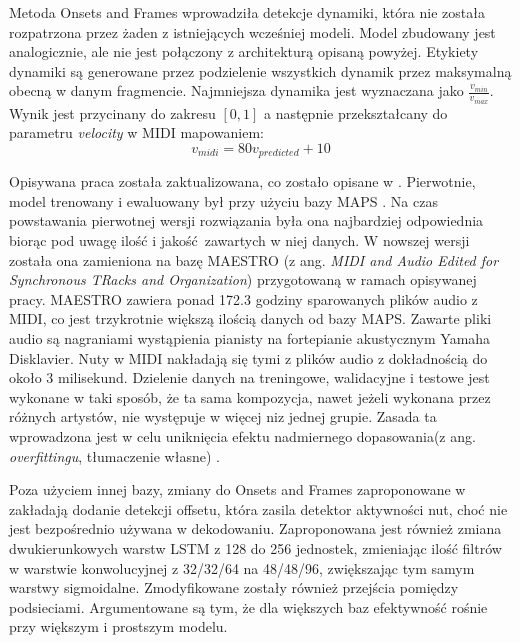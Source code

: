 \documentclass[12pt,a4paper,twoside]{mwart}
\begin{document}
Metoda Onsets and Frames wprowadziła detekcje dynamiki, która nie została rozpatrzona przez żaden z istniejących wcześniej modeli. Model zbudowany jest analogicznie, ale nie jest połączony z architekturą opisaną powyżej. Etykiety dynamiki są generowane przez podzielenie wszystkich dynamik przez maksymalną obecną w danym fragmencie. Najmniejsza dynamika jest wyznaczana jako $\frac{v_{min}}{v_{max}}$. Wynik jest przycinany do zakresu $\left[0,1\right]$ a następnie przekształcany do parametru \textit{velocity} w MIDI mapowaniem:
\begin{equation}
  v_{midi} = 80 v_{predicted} + 10
\end{equation}

Opisywana praca została zaktualizowana, co zostało opisane w 
\cite[3-5]{Transcription:Cheng:OnsetsAndFramesNovelization}
. Pierwotnie, model trenowany i ewaluowany był przy użyciu bazy MAPS \cite{Transcription:OnsetsAndFrames:MAPS}. Na czas powstawania pierwotnej wersji rozwiązania była ona najbardziej odpowiednia biorąc pod uwagę ilość i jakość zawartych w niej danych. W nowszej wersji została ona zamieniona na bazę MAESTRO (z ang. \textit{MIDI and Audio Edited for Synchronous TRacks and Organization}) przygotowaną w ramach opisywanej pracy. MAESTRO zawiera ponad 172.3 godziny sparowanych plików audio z MIDI, co jest trzykrotnie większą ilością danych od bazy MAPS. Zawarte pliki audio są nagraniami wystąpienia pianisty na fortepianie akustycznym Yamaha Disklavier. Nuty w MIDI nakładają się tymi z plików audio z dokładnością do około 3 milisekund. Dzielenie danych na treningowe, walidacyjne i testowe jest wykonane w taki sposób, że ta sama kompozycja, nawet jeżeli wykonana przez różnych artystów, nie występuje w więcej niz jednej grupie. Zasada ta wprowadzona jest w celu uniknięcia efektu nadmiernego dopasowania(z ang. \textit{overfittingu}, tłumaczenie własne) \cite{Transcription:Curtis:MAESTRO}.

Poza użyciem innej bazy, zmiany do Onsets and Frames zaproponowane w 
\cite[3-5]{Transcription:Cheng:OnsetsAndFramesNovelization} 
zakładają dodanie detekcji offsetu, która zasila detektor aktywności nut, choć nie jest bezpośrednio używana w dekodowaniu. Zaproponowana jest również zmiana dwukierunkowych warstw LSTM z 128 do 256 jednostek, zmieniając ilość filtrów w warstwie konwolucyjnej z 32/32/64 na 48/48/96, zwiększając tym samym warstwy sigmoidalne. Zmodyfikowane zostały również przejścia pomiędzy podsieciami. Argumentowane są tym, że dla większych baz efektywność rośnie przy większym i prostszym modelu. 
\end{document}
